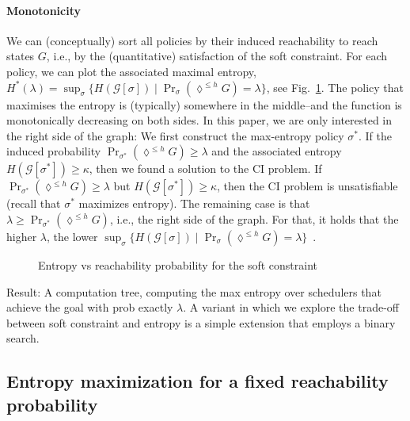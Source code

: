 \documentclass[conference]{IEEEtran}
\theoremstyle{remark}
\newcommand{\sg}{\mathcal{G}}
\newcommand{\eventually}[1]{\lozenge^{\leq #1}}
\newcommand{\sched}{\sigma}
\begin{document}
\paragraph{Monotonicity}
We can (conceptually) sort all policies by their induced reachability to reach states $G$, i.e., by the (quantitative) satisfaction of the soft constraint. For each policy, we can plot the associated maximal entropy, $H^*(\lambda) = \sup_{\sched} \{ H(\sg[\sched]) \mid \Pr_{\sched}(\eventually{h} G) = \lambda\}$, see Fig.~\ref{fig:entropyvspsat}.
The policy that maximises the entropy is (typically) somewhere in the middle--and the function is monotonically decreasing on both sides. 
In this paper, we are only interested in the right side of the graph:
We first construct the max-entropy policy $\sched^*$. If the induced probability $\Pr_{\sched^*}(\eventually{h} G) \geq \lambda$ and the associated entropy $H(\sg[\sched^*]) \geq \kappa$, then we found a solution to the CI problem. If $\Pr_{\sched^*}(\eventually{h} G) \geq \lambda$ but $H(\sg[\sched^*]) \geq \kappa$, then the CI problem is unsatisfiable (recall that $\sched^*$ maximizes entropy).
The remaining case is that $\lambda \geq \Pr_{\sched^*}(\eventually{h} G)$, i.e., the right side of the graph.
For that, it holds that the higher $\lambda$, the lower $\sup_{\sched} \{ H(\sg[\sched]) \mid \Pr_{\sched}(\eventually{h} G) = \lambda\}$~. 
\begin{figure}
\label{fig:entropyvspsat}
\caption{Entropy vs reachability probability for the soft constraint}
\end{figure}
Result: A computation tree, computing the max entropy over schedulers that achieve the goal with prob exactly $\lambda$.
A variant in which we explore the trade-off between soft constraint and entropy is a simple extension that employs a binary search.
\subsection{Entropy maximization for a fixed reachability probability}
\end{document}
